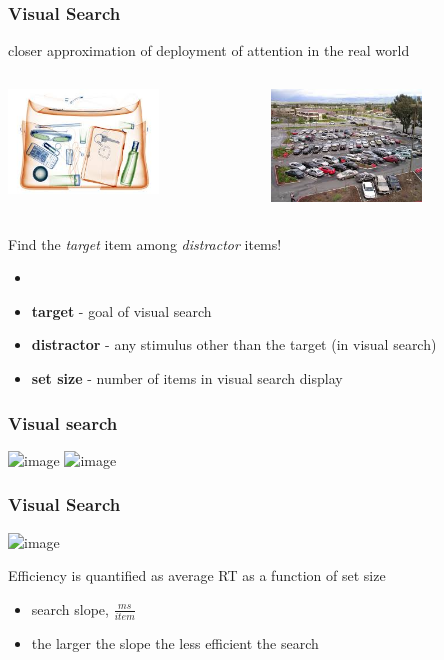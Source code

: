 \documentclass[]{beamer}
\begin{document}
\begin{frame}
 \frametitle{Visual Search}
\begin{overlayarea}{120mm}{70mm}
closer approximation of deployment of attention in the real world
\vspace{4mm}
\begin{columns}[T]
 \begin{column}{50mm}
\includegraphics[width=40mm]{figs/l8/suitcase_scan.jpg}
 \end{column}

 \begin{column}{60mm} 
\includegraphics[width=40mm]{figs/l8/car_in_parking_lot.jpg}
 \end{column}
\end{columns}

\vspace{4mm}
Find the \textit{target} item among \textit{distractor} items!
\begin{itemize}
 \item[] 
 \item<2->[] \textbf{target} - goal of visual search
 \item<2->[] \textbf{distractor} - any stimulus other than the target (in visual search)
 \item<2->[] \textbf{set size} - number of items in visual search display
\end{itemize}
\end{overlayarea}
\end{frame}

\begin{frame}
 \frametitle{Visual search}
\includegraphics<1>[width=110mm]{figs/l8/types_visual_search_displays.png}
\includegraphics<2>[width=110mm]{figs/l8/types_visual_search.png}
\end{frame}

\begin{frame}
 \frametitle{Visual Search}
\begin{center}
\includegraphics<1>[width=100mm]{figs/l8/types_visual_search_summary.png}
\end{center}

Efficiency is quantified as average RT as a function of set size 
\begin{itemize}
  \item search slope, $\frac{ms}{item}$
  \item the larger the slope the less efficient the search
 \end{itemize}

\end{frame}
\end{document}
